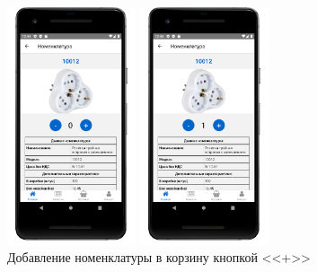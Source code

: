 \begin{figure}[!htb]\centering
    \begin{minipage}{0.49\textwidth}\centering
        \begin{minipage}{0.40\textwidth}
            \centering
    
            \includegraphics[height=7cm]
            {images/mobile/basket/basket_1.png}
        \end{minipage}
        \begin{minipage}{0.33\textwidth}
            \centering
    
            \includegraphics[height=7cm]
            {images/mobile/basket/basket_2.png}
        \end{minipage}

        \caption{Добавление номенклатуры в корзину кнопкой <<+>>}
        \label{fig:test_basket_plus_minus}
    \end{minipage}
    \begin{minipage}{0.49\textwidth}\centering
        \begin{minipage}{0.40\textwidth}
            \centering
    

\end{minipage}
\end{minipage}
\end{figure}

